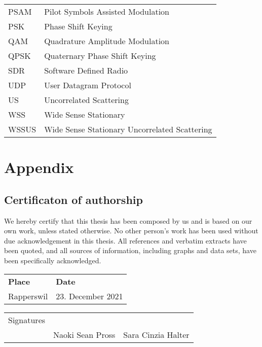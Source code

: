 \documentclass[
	overfullrule,
	paper = a4, twoside, openright, BCOR = 5mm,
	headinclude, footexclude,
	fontsize = 11pt,
	cleardoublepage = empty,
	titlepage, abstract = on,
	automark,
	numbers = noenddot
]{scrreprt}
\begin{document}
\begin{tabularx}{\linewidth}{l X}
		PSAM   & Pilot Symbols Assisted Modulation                \\
		PSK    & Phase Shift Keying                               \\
		QAM    & Quadrature Amplitude Modulation                  \\
		QPSK   & Quaternary Phase Shift Keying                    \\
		SDR    & Software Defined Radio                           \\
		UDP    & User Datagram Protocol                           \\
		US     & Uncorrelated Scattering                          \\
		WSS    & Wide Sense Stationary                            \\
		WSSUS  & Wide Sense Stationary Uncorrelated Scattering    \\
		\bottomrule
	\end{tabularx}

	\cleardoublepage

	\hypersetup{pageanchor = true}
	\setcounter{page}{1}
	\pagestyle{scrheadings}

	
	
	
	

	\printskelnotes
	\printbibliography

	\appendix
	\chapter{Appendix}

	\section{Certificaton of authorship}
	We hereby certify that this thesis has been composed by us and is based on our own work, unless stated otherwise. No other person's work has been used without due acknowledgement in this thesis. All references and verbatim extracts have been quoted, and all sources of information, including graphs and data sets, have been specifically acknowledged.

	\vspace{5mm}
	\begin{tabular}{ ll }
		\bfseries Place & \bfseries Date \\
		Rapperswil & 23. December 2021
	\end{tabular}
	\vspace{1cm}
	\begin{flushright}
		\begin{tabularx}{\linewidth}{ rXX }
			Signatures
				& \hrulefill & \hrulefill \\
				& Naoki Sean Pross & Sara Cinzia Halter \\
		\end{tabularx}
	\end{flushright}
	\vspace{2cm}
\end{document}
